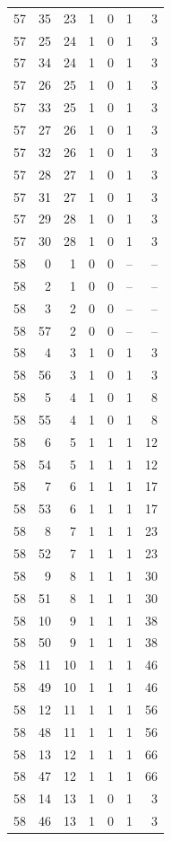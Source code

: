 \begin{longtable}{rrrrrrr}
57 & 35 & 23 & 1 & 0 & 1 & 3\\
57 & 25 & 24 & 1 & 0 & 1 & 3\\
57 & 34 & 24 & 1 & 0 & 1 & 3\\
57 & 26 & 25 & 1 & 0 & 1 & 3\\
57 & 33 & 25 & 1 & 0 & 1 & 3\\
57 & 27 & 26 & 1 & 0 & 1 & 3\\
57 & 32 & 26 & 1 & 0 & 1 & 3\\
57 & 28 & 27 & 1 & 0 & 1 & 3\\
57 & 31 & 27 & 1 & 0 & 1 & 3\\
57 & 29 & 28 & 1 & 0 & 1 & 3\\
57 & 30 & 28 & 1 & 0 & 1 & 3\\
58 & 0 & 1 & 0 & 0 & -- & --\\
58 & 2 & 1 & 0 & 0 & -- & --\\
58 & 3 & 2 & 0 & 0 & -- & --\\
58 & 57 & 2 & 0 & 0 & -- & --\\
58 & 4 & 3 & 1 & 0 & 1 & 3\\
58 & 56 & 3 & 1 & 0 & 1 & 3\\
58 & 5 & 4 & 1 & 0 & 1 & 8\\
58 & 55 & 4 & 1 & 0 & 1 & 8\\
58 & 6 & 5 & 1 & 1 & 1 & 12\\
58 & 54 & 5 & 1 & 1 & 1 & 12\\
58 & 7 & 6 & 1 & 1 & 1 & 17\\
58 & 53 & 6 & 1 & 1 & 1 & 17\\
58 & 8 & 7 & 1 & 1 & 1 & 23\\
58 & 52 & 7 & 1 & 1 & 1 & 23\\
58 & 9 & 8 & 1 & 1 & 1 & 30\\
58 & 51 & 8 & 1 & 1 & 1 & 30\\
58 & 10 & 9 & 1 & 1 & 1 & 38\\
58 & 50 & 9 & 1 & 1 & 1 & 38\\
58 & 11 & 10 & 1 & 1 & 1 & 46\\
58 & 49 & 10 & 1 & 1 & 1 & 46\\
58 & 12 & 11 & 1 & 1 & 1 & 56\\
58 & 48 & 11 & 1 & 1 & 1 & 56\\
58 & 13 & 12 & 1 & 1 & 1 & 66\\
58 & 47 & 12 & 1 & 1 & 1 & 66\\
58 & 14 & 13 & 1 & 0 & 1 & 3\\
58 & 46 & 13 & 1 & 0 & 1 & 3\\

\end{longtable}
